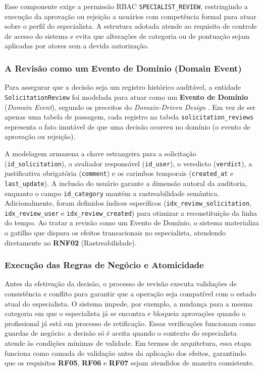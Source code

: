 Esse componente exige a permissão RBAC \texttt{SPECIALIST\_REVIEW}, restringindo a
execução da aprovação ou rejeição a usuários com competência formal para atuar sobre o
perfil do especialista. A estrutura adotada atende ao requisito de controle de acesso do
sistema e evita que alterações de categoria ou de pontuação sejam aplicadas por atores
sem a devida autorização.

\subsubsection{A Revisão como um Evento de Domínio (Domain Event)}
\label{subsubsec:revisao-como-evento-dominio}
Para assegurar que a decisão seja um registro histórico auditável, a entidade
\texttt{SolicitationReview} foi modelada para atuar como um \textbf{Evento de Domínio}
(\textit{Domain Event}), segundo os preceitos do \textit{Domain-Driven Design}
. Em vez de ser apenas uma tabela de passagem, cada registro na tabela
\texttt{solicitation\_reviews} representa o fato imutável de que uma decisão ocorreu no
domínio (o evento de aprovação ou rejeição).

A modelagem armazena a chave estrangeira para a solicitação (\texttt{id\_solicitation}),
o avaliador responsável (\texttt{id\_user}), o veredicto (\texttt{verdict}), a
justificativa obrigatória (\texttt{comment}) e os carimbos temporais
(\texttt{created\_at} e \texttt{last\_update}). A inclusão do usuário garante a dimensão
autoral da auditoria, enquanto o campo \texttt{id\_category} mantém a rastreabilidade
semântica. Adicionalmente, foram definidos índices específicos
(\texttt{idx\_review\_solicitation}, \texttt{idx\_review\_user} e
\texttt{idx\_review\_created}) para otimizar a reconstituição da linha do tempo. Ao
tratar a revisão como um Evento de Domínio, o sistema materializa o gatilho que dispara
os efeitos transacionais no especialista, atendendo diretamente ao \textbf{RNF02}
(Rastreabilidade).

\subsubsection{Execução das Regras de Negócio e Atomicidade}

Antes da efetivação da decisão, o processo de revisão executa validações de consistência
e conflito para garantir que a operação seja compatível com o estado atual do
especialista. O sistema impede, por exemplo, a mudança para a mesma categoria em que o
especialista já se encontra e bloqueia aprovações quando o profissional já está em
processo de retificação. Essas verificações funcionam como guardas de negócio: a decisão
só é aceita quando o contexto do especialista atende às condições mínimas de validade.
Em termos de arquitetura, essa etapa funciona como camada de validação antes da
aplicação dos efeitos, garantindo que os requisitos \textbf{RF05}, \textbf{RF06} e
\textbf{RF07} sejam atendidos de maneira consistente.

